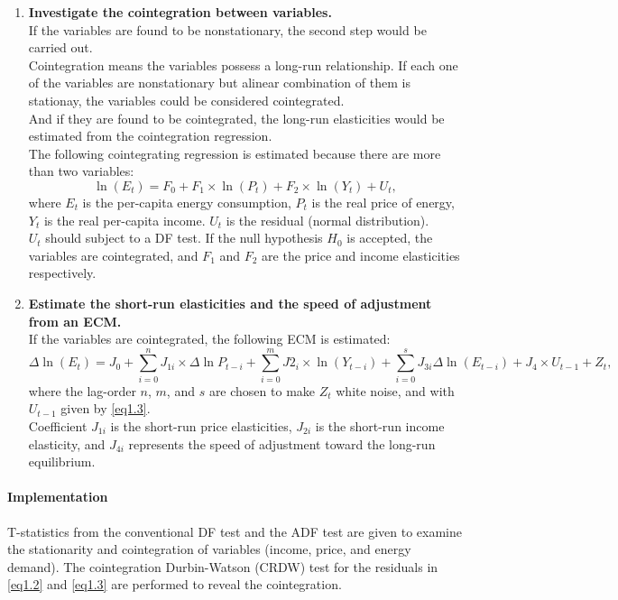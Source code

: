 {\begin{enumerate}
		\item  \textbf{Investigate the cointegration between variables. }\\
		If the variables are found to be nonstationary, the second step would be carried out. \\
		\small {Cointegration means the variables possess a long-run relationship. If each one of the variables are nonstationary but alinear combination of them is stationay, the variables could be considered cointegrated.}\\
		And if they are found to be cointegrated, the long-run elasticities would be estimated from the cointegration regression. \\
		The following cointegrating regression is estimated because there are more than two variables: 
		\begin{equation}\label{eq1.3}
			\ln(E_t) = F_0 + F_1 \times \ln(P_t)+ F_2 \times \ln(Y_t) + U_t,
		\end{equation}
		where $E_t$ is the per-capita energy consumption, $P_t$ is the real price of energy, $Y_t$ is the real per-capita income. $U_t$ is the residual (normal distribution).\\
		$U_t$ should subject to a DF test. If the null hypothesis $H_0$ is accepted, the variables are cointegrated, and $F_1$ and $F_2$ are the price and income elasticities respectively. \\ 
		
		\item \textbf{Estimate the short-run elasticities and the speed of adjustment from an ECM. }\\
		If the variables are cointegrated, the following ECM is estimated: 
		\begin{equation}\label{eq1.4}
			\Delta \ln(E_t) = J_0 + \sum_{i=0}^{n} J_{1i} \times \Delta \ln{P_{t-i}} + \sum_{i=0}^{m} J2_i \times \ln(Y_{t-i})+ \sum_{i=0}^{s} J_{3i} \Delta \ln(E_{t-i}) + J_4 \times U_{t-1} + Z_t,
		\end{equation}
		where the lag-order $n$, $m$, and $s$ are chosen to make $Z_t$ white noise, and with $U_{t-1}$ given by \cref{eq1.3}. \\
		Coefficient $J_{1i}$ is the short-run price elasticities, $J_{2i}$ is the short-run income elasticity, and $J_{4i}$ represents the speed of adjustment toward the long-run equilibrium.\\		
	\end{enumerate}
}

\paragraph{Implementation\\}{T-statistics from the conventional DF test and the ADF test are given to examine the stationarity and cointegration of variables (income, price, and energy demand). The cointegration Durbin-Watson (CRDW) test for the residuals in \cref{eq1.2} and \cref{eq1.3} are performed to reveal the cointegration. }

